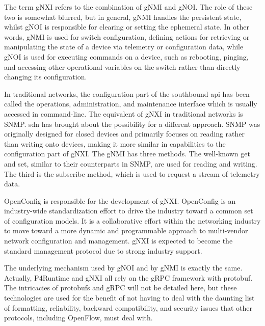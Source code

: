 The term gNXI refers to the combination of gNMI and gNOI. The role of these two is somewhat blurred, but in general, gNMI handles the persistent state, whilst gNOI is responsible for clearing or setting the ephemeral state. In other words, gNMI is used for switch configuration, defining actions for retrieving or manipulating the state of a device via telemetry or configuration data, while gNOI is used for executing commands on a device, such as rebooting, pinging, and accessing other operational variables on the switch rather than directly changing its configuration\cite{peterson_software-defined_2021}\cite{openconfig.net}.

In traditional networks, the configuration part of the southbound api has been called the operations, administration, and maintenance interface which is usually accessed in command-line\cite{peterson_software-defined_2021}. The equivalent of gNXI in traditional networks is SNMP. \gls{sdn} has brought about the possibility for a different approach. SNMP was originally designed for closed devices and primarily focuses on reading rather than writing onto devices, making it more similar in capabilities to the configuration part of gNXI\cite{peterson_software-defined_2021}.
The gNMI has three methods. The well-known get and set, similar to their counterparts in SNMP, are used for reading and writing. The third is the subscribe method, which is used to request a stream of telemetry data\cite{peterson_software-defined_2021}.

OpenConfig is responsible for the development of gNXI. OpenConfig is an industry-wide standardization effort to drive the industry toward a common set of configuration models. It is a collaborative effort within the networking industry to move toward a more dynamic and programmable approach to multi-vendor network configuration and management. gNXI is expected to become the standard management protocol due to strong industry support\cite{peterson_software-defined_2021}.

The underlying mechanism used by gNOI and by gNMI is exactly the same\cite{peterson_software-defined_2021}. Actually, P4Runtime and gNXI all rely on the gRPC framework with protobuf\cite{hauser_survey_2021}. The intricacies of protobufs and gRPC will not be detailed here, but these technologies are used for the benefit of not having to deal with the daunting list of formatting, reliability, backward compatibility, and security issues that other protocols, including OpenFlow, must deal with\cite{peterson_software-defined_2021}.

